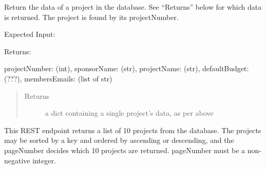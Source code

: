 \documentclass[letterpaper,10pt,english]{sphinxmanual}
\begin{document}
\begin{fulllineitems}
\begin{fulllineitems}
\begin{quote}
\begin{description}
\end{description}\end{quote}

\end{fulllineitems}


\begin{fulllineitems}
\label{\detokenize{apidoc/utdesign_procurement:utdesign_procurement.apigateway.ApiGateway.projectSingleData}}
Return the data of a project in the database. See “Returns” below for
which data is returned. The project is found by its projectNumber.

Expected Input:

\begin{sphinxVerbatim}[commandchars=\\\{\}]
     
\end{sphinxVerbatim}

Returns:

\begin{sphinxVerbatim}[commandchars=\\\{\}]
\PYGZob{}
    \PYGZsq{}projectNumber\PYGZsq{}: (int),
    \PYGZsq{}sponsorName\PYGZsq{}: (str),
    \PYGZsq{}projectName\PYGZsq{}: (str),
    \PYGZsq{}defaultBudget\PYGZsq{}: (???),
    \PYGZsq{}membersEmails\PYGZsq{}: (list of str)
\PYGZcb{}
\end{sphinxVerbatim}
\begin{quote}\begin{description}
\item[{Returns}] \leavevmode
a dict containing a single project’s data, as per above

\end{description}\end{quote}

\end{fulllineitems}


\begin{fulllineitems}
\label{\detokenize{apidoc/utdesign_procurement:utdesign_procurement.apigateway.ApiGateway.projectSpreadsheetData}}
This REST endpoint returns a list of 10 projects from the database. The projects may be
sorted by a key and ordered by ascending or descending, and the pageNumber
decides which 10 projects are returned. pageNumber must be a non-negative integer.


\end{fulllineitems}
\end{fulllineitems}
\end{document}
